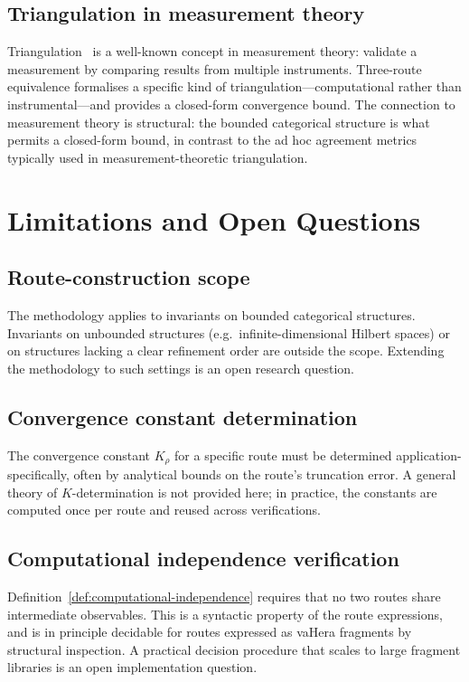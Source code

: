 \documentclass[twocolumn,11pt,a4paper]{article}
\newcommand{\Route}{\rho}
\newcommand{\Tolb}{K}
\begin{document}
\subsection{Triangulation in measurement theory}

Triangulation~\citep{denzin1978sociological,jick1979mixing} is a well-known concept in measurement theory: validate a measurement by comparing results from multiple instruments. Three-route equivalence formalises a specific kind of triangulation---computational rather than instrumental---and provides a closed-form convergence bound. The connection to measurement theory is structural: the bounded categorical structure is what permits a closed-form bound, in contrast to the ad hoc agreement metrics typically used in measurement-theoretic triangulation.

\section{Limitations and Open Questions}
\label{sec:limitations}

\subsection{Route-construction scope}

The methodology applies to invariants on bounded categorical structures. Invariants on unbounded structures (e.g.\ infinite-dimensional Hilbert spaces) or on structures lacking a clear refinement order are outside the scope. Extending the methodology to such settings is an open research question.

\subsection{Convergence constant determination}

The convergence constant $\Tolb_\Route$ for a specific route must be determined application-specifically, often by analytical bounds on the route's truncation error. A general theory of $\Tolb$-determination is not provided here; in practice, the constants are computed once per route and reused across verifications.

\subsection{Computational independence verification}

Definition~\ref{def:computational-independence} requires that no two routes share intermediate observables. This is a syntactic property of the route expressions, and is in principle decidable for routes expressed as vaHera fragments by structural inspection. A practical decision procedure that scales to large fragment libraries is an open implementation question.
\end{document}
